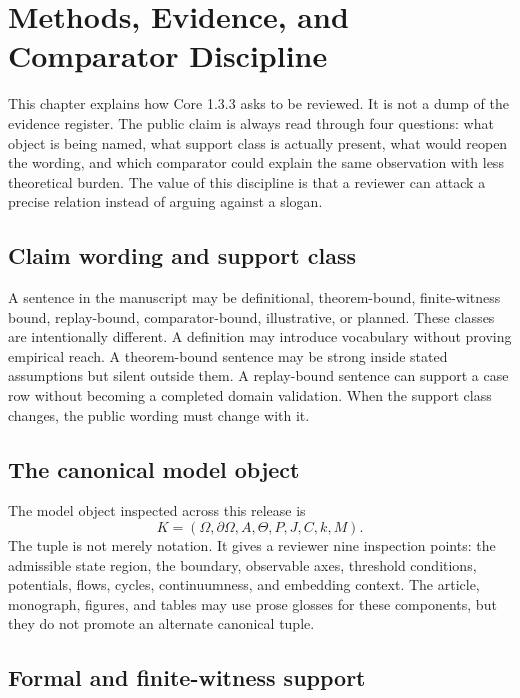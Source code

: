 \section{Methods, Evidence, and Comparator Discipline}
\label{sec:oc133-methods-evidence-comparators}

This chapter explains how Core 1.3.3 asks to be reviewed. It is not a dump of
the evidence register. The public claim is always read through four questions:
what object is being named, what support class is actually present, what would
reopen the wording, and which comparator could explain the same observation
with less theoretical burden. The value of this discipline is that a reviewer
can attack a precise relation instead of arguing against a slogan.

\subsection{Claim wording and support class}

A sentence in the manuscript may be definitional, theorem-bound, finite-witness
bound, replay-bound, comparator-bound, illustrative, or planned. These classes
are intentionally different. A definition may introduce vocabulary without
proving empirical reach. A theorem-bound sentence may be strong inside stated
assumptions but silent outside them. A replay-bound sentence can support a
case row without becoming a completed domain validation. When the support class
changes, the public wording must change with it.

\subsection{The canonical model object}

The model object inspected across this release is
\[
  K=(\Omega,\partial\Omega,A,\Theta,P,J,C,k,M).
\]
The tuple is not merely notation. It gives a reviewer nine inspection points:
the admissible state region, the boundary, observable axes, threshold
conditions, potentials, flows, cycles, continuumness, and embedding context.
The article, monograph, figures, and tables may use prose glosses for these
components, but they do not promote an alternate canonical tuple.

\subsection{Formal and finite-witness support}

